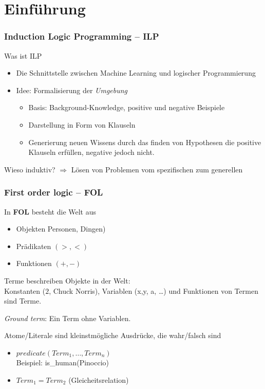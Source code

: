 \section{Einführung}

\begin{frame}
	\frametitle{Induction Logic Programming -- ILP}

	\begin{block}{Was ist ILP}
		\begin{itemize}
			\item Die Schnittstelle zwischen Machine Learning und logischer Programmierung
			\item {Idee: Formalisierung der \textit{Umgebung}
				\begin{itemize}
					\item Basis: Background-Knowledge, positive und negative Beispiele
					\item Darstellung in Form von Klauseln
					\item Generierung neuen Wissens durch das finden von Hypothesen die positive
					Klauseln erfüllen, negative jedoch nicht.
				\end{itemize}
			}
		\end{itemize}
	\end{block}
	Wieso induktiv?
	$\Rightarrow$ Lösen von Problemen vom spezifischen zum generellen
\end{frame}

\begin{frame}
	\frametitle{First order logic -- FOL}
	\begin{block}{}
	In \textbf{FOL} besteht die Welt aus
	\begin{itemize}
		\item Objekten  Personen, Dingen)
		\item Prädikaten $(>, <)$
		\item Funktionen $(+, -)$
	\end{itemize}
	\end{block}


	Terme beschreiben Objekte in der Welt:\\
	Konstanten ($2$, Chuck Norris), Variablen (x,y, a, \ldots) und
	Funktionen von Termen sind Terme.

	\textit{Ground term}: Ein Term ohne Variablen.

	\begin{block}{}
		Atome/Literale sind kleinstmögliche Ausdrücke, die wahr/falsch sind
		\begin{itemize}
			\item $predicate(Term_1, \ldots, Term_n)$\\ 
				Beispiel: is\_human(Pinoccio)
			\item $Term_1 = Term_2$ (Gleicheitsrelation)
		\end{itemize}
	\end{block}

\end{frame}

